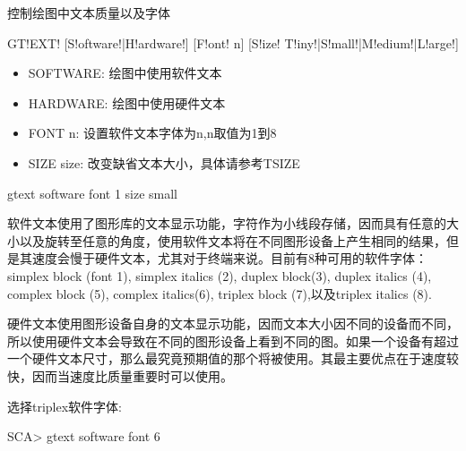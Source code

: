 \label{cmd:gtext}

控制绘图中文本质量以及字体

\begin{SACSTX}
GT!EXT! [S!oftware!|H!ardware!] [F!ont! n] [S!ize! T!iny!|S!mall!|M!edium!|L!arge!]
\end{SACSTX}

\begin{itemize}
\item SOFTWARE:  绘图中使用软件文本
\item HARDWARE:  绘图中使用硬件文本 
\item FONT n:  设置软件文本字体为n,n取值为1到8 
\item SIZE size:  改变缺省文本大小，具体请参考TSIZE 
\end{itemize}

\begin{SACDFT}
gtext software font 1 size small
\end{SACDFT}

软件文本使用了图形库的文本显示功能，字符作为小线段存储，因而具有任意的大小以及旋转至任意的角度，使用软件文本将在不同图形设备上产生相同的结果，但是其速度会慢于硬件文本，尤其对于终端来说。目前有8种可用的软件字体：simplex block (font 1), simplex italics (2), duplex block(3), duplex italics (4), complex block (5), complex italics(6), triplex block (7),以及triplex italics (8).  

硬件文本使用图形设备自身的文本显示功能，因而文本大小因不同的设备而不同，所以使用硬件文本会导致在不同的图形设备上看到不同的图。如果一个设备有超过一个硬件文本尺寸，那么最究竟预期值的那个将被使用。其最主要优点在于速度较快，因而当速度比质量重要时可以使用。

选择triplex软件字体:
\begin{SACCode}
SCA> gtext software font 6
\end{SACCode}

